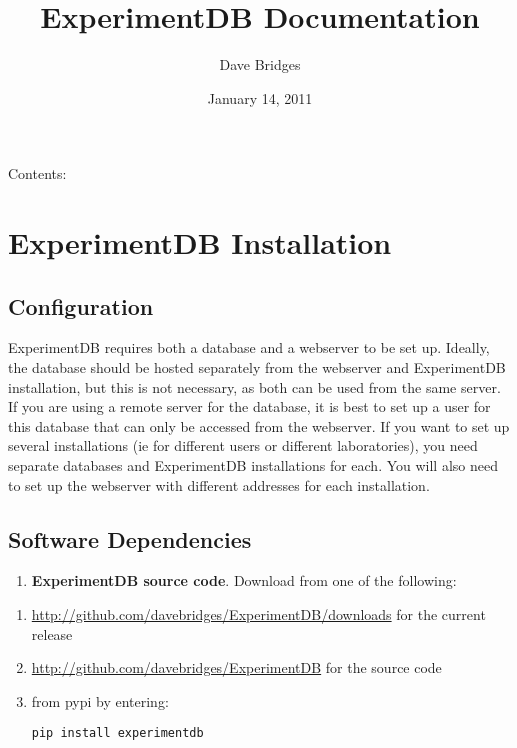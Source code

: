 \documentclass[letterpaper,10pt,english]{sphinxmanual}
\title{ExperimentDB Documentation}
\date{January 14, 2011}
\author{Dave Bridges}
\begin{document}
\maketitle
\tableofcontents
{}\label{index::doc}


Contents:



\chapter{ExperimentDB Installation}
\label{installation:experimentdb-installation}\label{installation::doc}\label{installation:welcome-to-experimentdb-s-documentation}

\section{Configuration}
\label{installation:configuration}
ExperimentDB requires both a database and a webserver to be set up.  Ideally, the database should be hosted separately from the webserver and ExperimentDB installation, but this is not necessary, as both can be used from the same server.  If you are using a remote server for the database, it is best to set up a user for this database that can only be accessed from the webserver.  If you want to set up several installations (ie for different users or different laboratories), you need separate databases and ExperimentDB installations for each.  You will also need to set up the webserver with different addresses for each installation.



\section{Software Dependencies}
\label{installation:software-dependencies}\begin{enumerate}
\item {} 
\textbf{ExperimentDB source code}.  Download from one of the following:


\end{enumerate}
\begin{enumerate}
\item {} 
\href{http://github.com/davebridges/ExperimentDB/downloads}{http://github.com/davebridges/ExperimentDB/downloads} for the current release


\item {} 
\href{http://github.com/davebridges/ExperimentDB}{http://github.com/davebridges/ExperimentDB} for the source code


\item {} 
from pypi by entering:


\begin{Verbatim}[commandchars=@\[\]]
pip install experimentdb
\end{Verbatim}

\end{enumerate}
\end{document}
